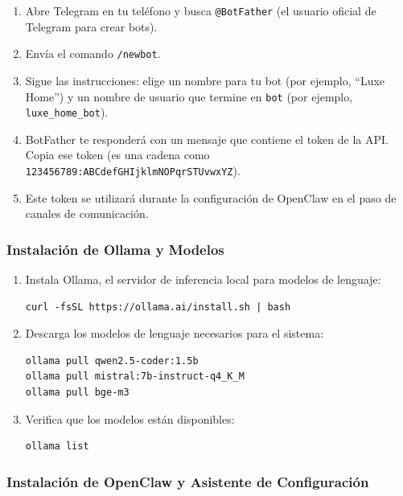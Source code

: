 \begin{enumerate}
    \item Abre Telegram en tu teléfono y busca \texttt{@BotFather} (el usuario oficial de Telegram para crear bots).
    \item Envía el comando \texttt{/newbot}.
    \item Sigue las instrucciones: elige un nombre para tu bot (por ejemplo, ``Luxe Home'') y un nombre de usuario que termine en \texttt{bot} (por ejemplo, \texttt{luxe\_home\_bot}).
    \item BotFather te responderá con un mensaje que contiene el token de la API. Copia ese token (es una cadena como \texttt{123456789:ABCdefGHIjklmNOPqrSTUvwxYZ}).
    \item Este token se utilizará durante la configuración de OpenClaw en el paso de canales de comunicación.
\end{enumerate}

\subsubsection*{Instalación de Ollama y Modelos}

\begin{enumerate}
    \item Instala Ollama, el servidor de inferencia local para modelos de lenguaje:
\begin{verbatim}
curl -fsSL https://ollama.ai/install.sh | bash
\end{verbatim}
    \item Descarga los modelos de lenguaje necesarios para el sistema:
\begin{verbatim}
ollama pull qwen2.5-coder:1.5b
ollama pull mistral:7b-instruct-q4_K_M
ollama pull bge-m3
\end{verbatim}
    \item Verifica que los modelos están disponibles:
\begin{verbatim}
ollama list
\end{verbatim}
\end{enumerate}

\subsubsection*{Instalación de OpenClaw y Asistente de Configuración}

